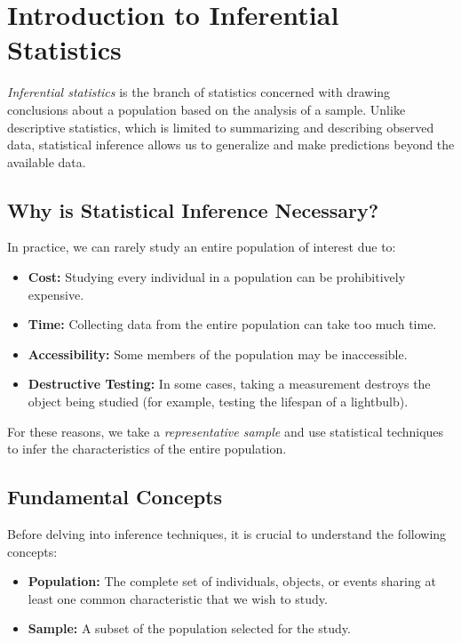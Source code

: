 \section*{Introduction to Inferential Statistics}

\emph{Inferential statistics} is the branch of statistics concerned with drawing conclusions about a population based on the analysis of a sample. Unlike descriptive statistics, which is limited to summarizing and describing observed data, statistical inference allows us to generalize and make predictions beyond the available data.

\subsection*{Why is Statistical Inference Necessary?}

In practice, we can rarely study an entire population of interest due to:

\begin{itemize}
	\item \textbf{Cost:} Studying every individual in a population can be prohibitively expensive.
	\item \textbf{Time:} Collecting data from the entire population can take too much time.
	\item \textbf{Accessibility:} Some members of the population may be inaccessible.
	\item \textbf{Destructive Testing:} In some cases, taking a measurement destroys the object being studied (for example, testing the lifespan of a lightbulb).
\end{itemize}

For these reasons, we take a \emph{representative sample} and use statistical techniques to infer the characteristics of the entire population.

\subsection*{Fundamental Concepts}

Before delving into inference techniques, it is crucial to understand the following concepts:

\begin{definicion}
	\begin{itemize}
		\item \textbf{Population:} The complete set of individuals, objects, or events sharing at least one common characteristic that we wish to study.
		\item \textbf{Sample:} A subset of the population selected for the study.
	\end{itemize}
\end{definicion}

